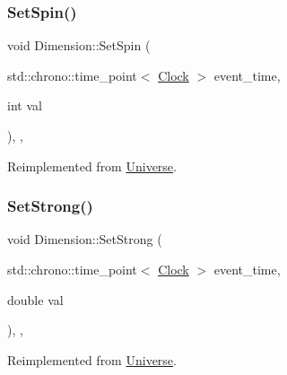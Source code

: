 \mbox{\label{classDimension_a8d73c050c67b0226572b4a1b08ae6594}} 
\subsubsection{\texorpdfstring{Set\+Spin()}{SetSpin()}}
{\footnotesize\ttfamily void Dimension\+::\+Set\+Spin (\begin{DoxyParamCaption}\item[{std\+::chrono\+::time\+\_\+point$<$ \mbox{\hyperlink{universe_8h_a0ef8d951d1ca5ab3cfaf7ab4c7a6fd80}{Clock}} $>$}]{event\+\_\+time,  }\item[{int}]{val }\end{DoxyParamCaption})\hspace{0.3cm}{\ttfamily [inline]}, {\ttfamily [final]}, {\ttfamily [virtual]}}



Reimplemented from \mbox{\hyperlink{classUniverse_ae2ae1c3b3e4cde2c18f5f6a814761ec8}{Universe}}.

\mbox{\label{classDimension_ab9021cb6727ed590026bf870c638576d}} 
\subsubsection{\texorpdfstring{Set\+Strong()}{SetStrong()}}
{\footnotesize\ttfamily void Dimension\+::\+Set\+Strong (\begin{DoxyParamCaption}\item[{std\+::chrono\+::time\+\_\+point$<$ \mbox{\hyperlink{universe_8h_a0ef8d951d1ca5ab3cfaf7ab4c7a6fd80}{Clock}} $>$}]{event\+\_\+time,  }\item[{double}]{val }\end{DoxyParamCaption})\hspace{0.3cm}{\ttfamily [inline]}, {\ttfamily [final]}, {\ttfamily [virtual]}}



Reimplemented from \mbox{\hyperlink{classUniverse_a5946c8f3d4cda305f3ecd10df21a2f94}{Universe}}.

\mbox{\label{classDimension_a2de864aaa4b1074684395dbe928468c1}} 
